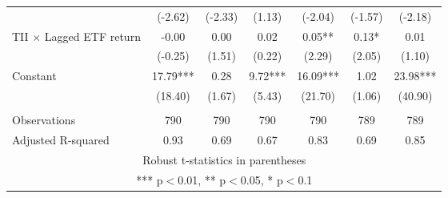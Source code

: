 \documentclass[]{article}
\begin{document}
\begin{tabular}{lcccccc}
 & (-2.62) & (-2.33) & (1.13) & (-2.04) & (-1.57) & (-2.18) \\
TII $\times$ Lagged ETF return & -0.00 & 0.00 & 0.02 & 0.05** & 0.13* & 0.01 \\
 & (-0.25) & (1.51) & (0.22) & (2.29) & (2.05) & (1.10) \\
Constant & 17.79*** & 0.28 & 9.72*** & 16.09*** & 1.02 & 23.98*** \\
 & (18.40) & (1.67) & (5.43) & (21.70) & (1.06) & (40.90) \\
 &  &  &  &  &  &  \\
Observations & 790 & 790 & 790 & 790 & 789 & 789 \\
 Adjusted R-squared & 0.93 & 0.69 & 0.67 & 0.83 & 0.69 & 0.85 \\ \hline
\multicolumn{7}{c}{ Robust t-statistics in parentheses} \\
\multicolumn{7}{c}{ *** p$<$0.01, ** p$<$0.05, * p$<$0.1} \\
\end{tabular}
\end{document}
